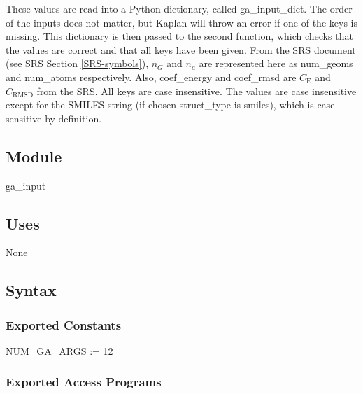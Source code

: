 \documentclass[12pt, titlepage]{article}
\newcommand{\progname}{Kaplan}
\begin{document}
These values are read into a Python dictionary, called ga\_input\_dict. The 
order of the inputs does not matter, but \progname{} will throw an error if one 
of the keys is missing. This dictionary is then passed to the second function, 
which checks that the values are correct and that all keys have been given. 
From the SRS document (see SRS Section \ref{SRS-symbols}),  $n_G$ and $n_a$ are 
represented here as num\_geoms and num\_atoms respectively. Also, coef\_energy 
and coef\_rmsd are $C_\text{E}$ and $C_\text{RMSD}$ from the SRS. All keys are 
case insensitive. The values are case insensitive except for the SMILES string 
(if chosen struct\_type is smiles), which is case sensitive by definition.

 


\subsection{Module}

ga\_input

\subsection{Uses}

None

\subsection{Syntax}

\subsubsection{Exported Constants}

NUM\_GA\_ARGS := 12

\subsubsection{Exported Access Programs}
\end{document}
